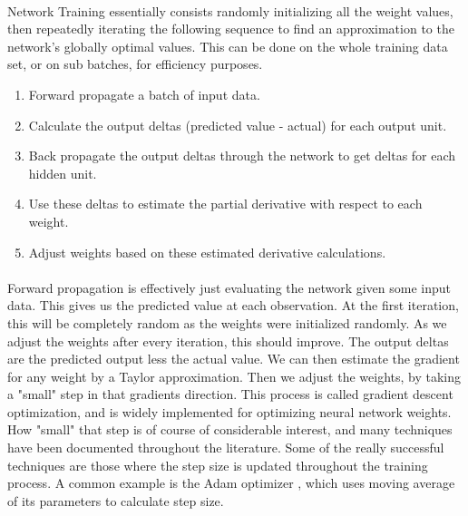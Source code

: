 \documentclass[11pt]{scrartcl} %
\begin{document}
\paragraph{}
Network Training essentially consists randomly initializing all the weight values, then repeatedly iterating the following sequence to find an approximation to the network's globally optimal values. This can be done on the whole training data set, or on sub batches, for efficiency purposes.
\begin{enumerate}
	\item Forward propagate a batch of input data.
	\item Calculate the output deltas (predicted value - actual) for each output unit.
	\item Back propagate the output deltas through the network to get deltas for each hidden unit.
	\item Use these deltas to estimate the partial derivative with respect to each weight.
	\item Adjust weights based on these estimated derivative calculations.
\end{enumerate}

\paragraph{}
Forward propagation is effectively just evaluating the network given some input data. This gives us the predicted value at each observation. At the first iteration, this will be completely random as the weights were initialized randomly. As we adjust the weights after every iteration, this should improve. The output deltas are the predicted output less the actual value. We can then estimate the gradient for any weight by a Taylor approximation. Then we adjust the weights, by taking a "small" step in that gradients direction. This process is called gradient descent optimization, and is widely implemented for optimizing neural network weights. How "small" that step is of course of considerable interest, and many techniques have been documented throughout the literature. Some of the really successful techniques are those where the step size is updated throughout the training process. A common example is the Adam optimizer \cite{adam}, which uses moving average of its parameters to calculate step size.



\end{document}
